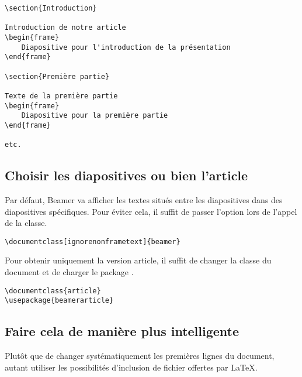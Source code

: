 \begin{verbatim}
\section{Introduction}

Introduction de notre article
\begin{frame}
	Diapositive pour l'introduction de la présentation
\end{frame}

\section{Première partie}

Texte de la première partie
\begin{frame}
	Diapositive pour la première partie
\end{frame}

etc.
\end{verbatim}

\subsection{Choisir les diapositives ou bien l'article}

Par défaut, Beamer va afficher les textes situés entre les diapositives dans des diapositives spécifiques. Pour éviter cela, il suffit de passer l'option  lors de l'appel de la classe.

\begin{verbatim}
\documentclass[ignorenonframetext]{beamer}
\end{verbatim}

Pour obtenir uniquement la version article, il suffit de changer la classe du document et de charger le package .

\begin{verbatim}
\documentclass{article}
\usepackage{beamerarticle}
\end{verbatim}

\subsection{Faire cela de manière plus intelligente}

Plutôt que de changer systématiquement les premières lignes du document, autant utiliser les possibilités d'inclusion de fichier offertes par \LaTeX{}. 

